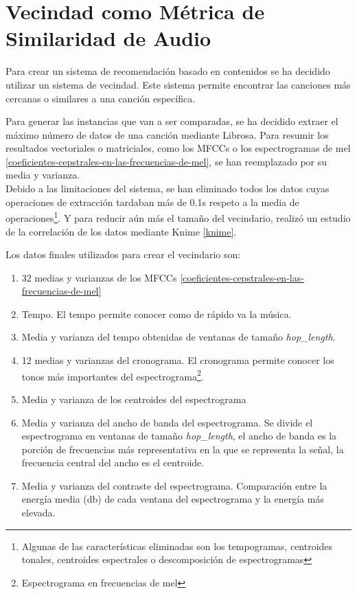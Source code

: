 \section{Vecindad como Métrica de Similaridad de Audio}
Para crear un sistema de recomendación basado en contenidos se ha decidido utilizar un sistema de vecindad. Este sistema permite encontrar las canciones más cercanas o similares a una canción específica.

Para generar las instancias que van a ser comparadas, se ha decidido extraer el máximo número de datos de una canción mediante Librosa. Para resumir los resultados vectoriales o matriciales, como los MFCCs o los espectrogramas de mel \ref{coeficientes-cepstrales-en-las-frecuencias-de-mel}, se han reemplazado por su media y varianza.\\
Debido a las limitaciones del sistema, se han eliminado todos los datos cuyas operaciones de extracción tardaban más de 0.1s respeto a la media de operaciones\footnote{Algunas de las características eliminadas son los tempogramas, centroides tonales, centroides espectrales o descomposición de espectrogramas}. Y para reducir aún más el tamaño del vecindario, realizó un estudio de la correlación de los datos mediante Knime \ref{knime}. 

Los datos finales utilizados para crear el vecindario son:
\begin{enumerate}
    \item 32 medias y varianzas de los  MFCCs \ref{coeficientes-cepstrales-en-las-frecuencias-de-mel}
    \item Tempo. El tempo permite conocer como de rápido va la música.
    \item Media y varianza del tempo obtenidas de ventanas de tamaño \textit{hop\_length}.
    \item 12 medias y varianzas del cronograma. El cronograma permite conocer los tonos más importantes del espectrograma\footnote{Espectrograma en frecuencias de mel}.
    \item Media y varianza de los centroides del espectrograma
    \item Media y varianza del ancho de banda del espectrograma. Se divide el espectrograma en ventanas de tamaño \textit{hop\_length}, el ancho de banda es la porción de frecuencias más representativa en la que se representa la señal, la frecuencia central del ancho es el centroide.
    \item Media y varianza del contraste del espectrograma. Comparación entre la energía media (db) de cada ventana del espectrograma y la energía más elevada.
\end{enumerate}

